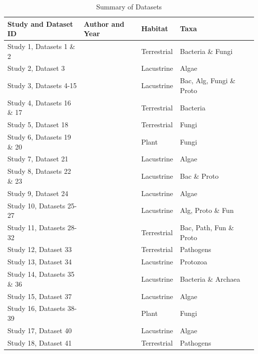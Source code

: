 \begin{table}[h]
    \caption{Summary of Datasets}
    \label{crouch}
    \begin{tabular}{  l  p{5cm} p{1.5cm}  p{3cm} p{3cm}}
        \toprule
\textbf{Study and Dataset ID} 
&\textbf{Author and Year}      
& \textbf{Habitat}
& \textbf{Taxa}   \\\midrule
Study 1, Datasets 1 \& 2
&\cite{li2020island}
& Terrestrial
& Bacteria \& Fungi \\\hline
Study 2, Dataset 3
&\cite{battes2019species} 
& Lacustrine
&Algae \\\hline
Study 3, Datasets 4-15
&\cite{darcy2018island} 
& Lacustrine
&Bac, Alg, Fungi \& Proto \\\hline
Study 4, Datasets 16 \& 17
&\cite{delgado2018experimentally} 
& Terrestrial
& Bacteria \\\hline
Study 5, Dataset 18
&\cite{davison2018microbial} 
& Terrestrial
& Fungi \\\hline
Study 6, Datasets 19 \& 20
&\cite{glassman2017theory} 
& Plant
& Fungi \\\hline
Study 7, Dataset 21
&\cite{varbiro2017functional} 
& Lacustrine
& Algae \\\hline
Study 8, Datasets 22 \& 23
&\cite{kavazos2016small} 
& Lacustrine
& Bac \& Proto \\\hline
Study 9, Dataset 24
&\cite{bolgovics2016species} 
& Lacustrine
& Algae \\\hline
Study 10, Datasets 25-27
&\cite{article} 
& Lacustrine
& Alg, Proto \& Fun \\\hline
Study 11, Datasets 28-32
&\cite{jean2016equilibrium} 
& Terrestrial
& Bac, Path, Fun \& Proto \\\hline
Study 12, Dataset 33
&\cite{cashdan2014biogeography} 
& Terrestrial
& Pathogens \\\hline
Study 13, Dataset 34
& \cite{LepereCecile2013Gdae}
& Lacustrine
&Protozoa \\\hline
Study 14, Datasets 35 \& 36
& \cite{LanzenAnders2013SPaE}
& Lacustrine
& Bacteria \& Archaea \\\hline
Study 15, Dataset 37
&\cite{RENGEFORSK2012Plma} 
& Lacustrine
& Algae \\\hline
Study 16, Datasets 38-39
&\cite{FeinsteinLarryM2012Tran} 
& Plant
& Fungi \\\hline
Study 17, Dataset 40
&\cite{StompMaayke2011Lbpi} 
& Lacustrine
& Algae \\\hline
Study 18, Dataset 41
&\cite{JohnL.Orrock2011BaER} 
& Terrestrial
& Pathogens \\\hline

\end{tabular}
\end{table}
